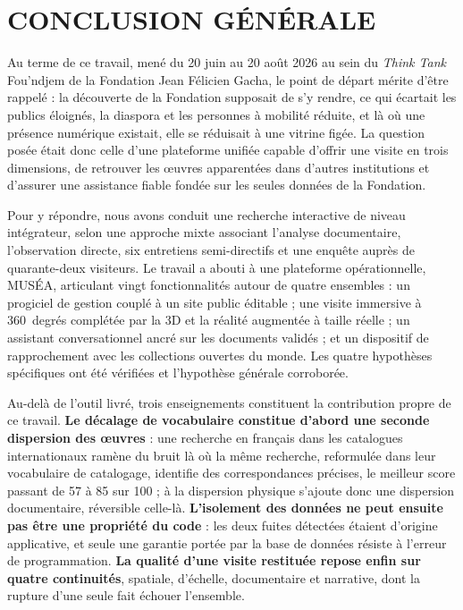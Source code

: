 \cleardoublepage
{}
\chapter*{CONCLUSION GÉNÉRALE}

Au terme de ce travail, mené du 20 juin au 20 août 2026 au sein du \emph{Think
Tank} Fou'ndjem de la Fondation Jean Félicien Gacha, le point de départ mérite
d'être rappelé : la découverte de la Fondation supposait de s'y rendre, ce qui
écartait les publics éloignés, la diaspora et les personnes à mobilité réduite,
et là où une présence numérique existait, elle se réduisait à une vitrine figée.
La question posée était donc celle d'une plateforme unifiée capable d'offrir une
visite en trois dimensions, de retrouver les œuvres apparentées dans d'autres
institutions et d'assurer une assistance fiable fondée sur les seules données de
la Fondation.

Pour y répondre, nous avons conduit une recherche interactive de niveau
intégrateur, selon une approche mixte associant l'analyse documentaire,
l'observation directe, six entretiens semi-directifs et une enquête auprès de
quarante-deux visiteurs. Le travail a abouti à une plateforme opérationnelle,
MUSÉA, articulant vingt fonctionnalités autour de quatre ensembles : un
progiciel de gestion couplé à un site public éditable ; une visite immersive à
360~degrés complétée par la 3D et la réalité augmentée à taille réelle ; un
assistant conversationnel ancré sur les documents validés ; et un dispositif de
rapprochement avec les collections ouvertes du monde. Les quatre hypothèses
spécifiques ont été vérifiées et l'hypothèse générale corroborée.

Au-delà de l'outil livré, trois enseignements constituent la contribution propre
de ce travail. \textbf{Le décalage de vocabulaire constitue d'abord une seconde
dispersion des œuvres} : une recherche en français dans les catalogues
internationaux ramène du bruit là où la même recherche, reformulée dans leur
vocabulaire de catalogage, identifie des correspondances précises, le meilleur
score passant de 57 à 85 sur 100 ; à la dispersion physique s'ajoute donc une
dispersion documentaire, réversible celle-là. \textbf{L'isolement des données ne
peut ensuite pas être une propriété du code} : les deux fuites détectées étaient
d'origine applicative, et seule une garantie portée par la base de données
résiste à l'erreur de programmation. \textbf{La qualité d'une visite restituée
repose enfin sur quatre continuités}, spatiale, d'échelle, documentaire et
narrative, dont la rupture d'une seule fait échouer l'ensemble.

